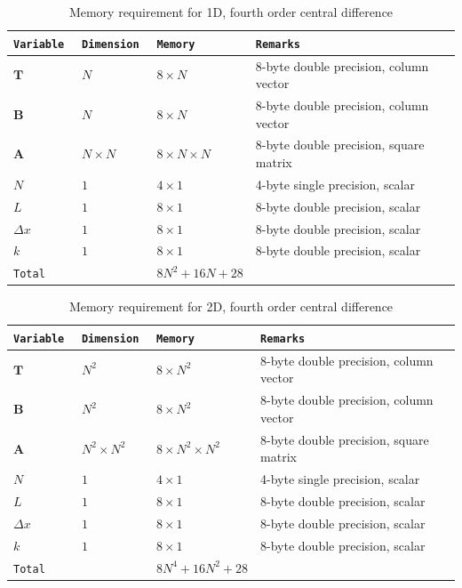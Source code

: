 \documentclass[12pt]{amsart}   %
\begin{document}
\begin{table}[htbp!] \caption{Memory requirement for 1D, fourth order central difference}
\begin{tabular}{lllll}
\tt{Variable} & \tt{Dimension} & \tt{Memory} & \tt{Remarks}  \\
\hline
 $\textbf{T}$ & $N$ & $8\times N$ & 8-byte double precision, column vector \\
 $\textbf{B}$ & $N$ & $8\times N$ & 8-byte double precision, column vector \\
 $\textbf{A}$ & $N \times N$ & $8 \times N \times N$ & 8-byte double precision, square matrix \\
 $N$ & $1$ & $4 \times1$ & 4-byte single precision, scalar \\
 $L$ & $1$ & $8 \times1$ & 8-byte double precision, scalar\\
 $\Delta x$ & $1$ & $8 \times 1$ & 8-byte double precision, scalar\\
 $k$ & $1$ & $8 \times 1$ & 8-byte double precision, scalar\\
 \hline
 \tt{Total} & & $8N^2 + 16N + 28 $ & \\
\end{tabular}
\end{table}

\begin{table}[htbp!] \caption{Memory requirement for 2D, fourth order central difference}
\begin{tabular}{lllll}
\tt{Variable} & \tt{Dimension} & \tt{Memory} & \tt{Remarks}  \\
\hline
 $\textbf{T}$ & $N^2$ & $8\times N^2$ & 8-byte double precision, column vector \\
 $\textbf{B}$ & $N^2$ & $8\times N^2$ & 8-byte double precision, column vector \\
 $\textbf{A}$ & $N^2 \times N^2$ & $8 \times N^2 \times N^2$ & 8-byte double precision, square matrix \\
 $N$ & $1$ & $4 \times1$ & 4-byte single precision, scalar \\
 $L$ & $1$ & $8 \times1$ & 8-byte double precision, scalar\\
 $\Delta x$ & $1$ & $8 \times 1$ & 8-byte double precision, scalar\\
 $k$ & $1$ & $8 \times 1$ & 8-byte double precision, scalar\\
 \hline
 \tt{Total} & & $8N^4 + 16N^2 + 28 $ & \\
\end{tabular}
\end{table}
\newpage
\end{document}
